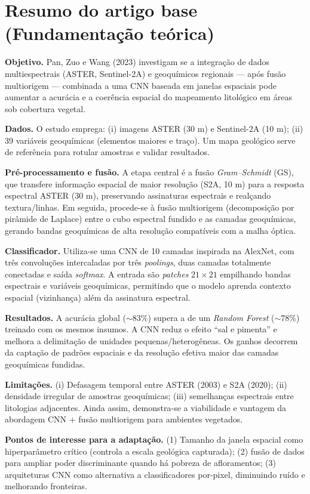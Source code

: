 \documentclass[12pt,a4paper]{article}
\begin{document}
\section{Resumo do artigo base (Fundamentação teórica)}
\textbf{Objetivo.} Pan, Zuo e Wang (2023) investigam se a integração de dados multiespectrais (ASTER, Sentinel-2A) e geoquímicos regionais --- após fusão multiorigem --- combinada a uma CNN baseada em janelas espaciais pode aumentar a acurácia e a coerência espacial do mapeamento litológico em áreas sob cobertura vegetal.

\textbf{Dados.} O estudo emprega: (i) imagens ASTER (30 m) e Sentinel-2A (10 m); (ii) 39 variáveis geoquímicas (elementos maiores e traço). Um mapa geológico serve de referência para rotular amostras e validar resultados.

\textbf{Pré-processamento e fusão.} A etapa central é a fusão \emph{Gram--Schmidt} (GS), que transfere informação espacial de maior resolução (S2A, 10 m) para a resposta espectral ASTER (30 m), preservando assinaturas espectrais e realçando textura/linhas. Em seguida, procede-se à fusão multiorigem (decomposição por pirâmide de Laplace) entre o cubo espectral fundido e as camadas geoquímicas, gerando bandas geoquímicas de alta resolução compatíveis com a malha óptica.

\textbf{Classificador.} Utiliza-se uma CNN de 10 camadas inspirada na AlexNet, com três convoluções intercaladas por três \emph{poolings}, duas camadas totalmente conectadas e saída \emph{softmax}. A entrada são \emph{patches} $21 \times 21$ empilhando bandas espectrais e variáveis geoquímicas, permitindo que o modelo aprenda contexto espacial (vizinhança) além da assinatura espectral.

\textbf{Resultados.} A acurácia global ($\sim 83\%$) supera a de um \emph{Random Forest} ($\sim 78\%$) treinado com os mesmos insumos. A CNN reduz o efeito ``sal e pimenta'' e melhora a delimitação de unidades pequenas/heterogêneas. Os ganhos decorrem da captação de padrões espaciais e da resolução efetiva maior das camadas geoquímicas fundidas.

\textbf{Limitações.} (i) Defasagem temporal entre ASTER (2003) e S2A (2020); (ii) densidade irregular de amostras geoquímicas; (iii) semelhanças espectrais entre litologias adjacentes. Ainda assim, demonstra-se a viabilidade e vantagem da abordagem CNN + fusão multiorigem para ambientes vegetados.

\textbf{Pontos de interesse para a adaptação.} (1) Tamanho da janela espacial como hiperparâmetro crítico (controla a escala geológica capturada); (2) fusão de dados para ampliar poder discriminante quando há pobreza de afloramentos; (3) arquiteturas CNN como alternativa a classificadores por-pixel, diminuindo ruído e melhorando fronteiras.
\end{document}
